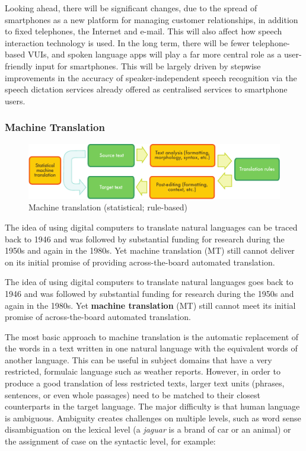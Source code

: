 \documentclass[]{../../metanetpaper}
\begin{document}
\begin{multicols}{2}
Looking ahead, there will be significant changes, due to the spread of smartphones as a new platform for managing customer relationships, in addition to fixed telephones, the Internet and e-mail. This will also affect how speech interaction technology is used. In the long term, there will be fewer telephone-based VUIs, and spoken language apps will play a far more central role as a user-friendly input for smartphones. This will be largely driven by stepwise improvements in the accuracy of speaker-independent speech recognition via the speech dictation services already offered as centralised services to smartphone users.

\subsubsection{Machine Translation}

\begin{figure}[htb]
  \center
  \includegraphics[width=\textwidth]{../_media/english/machine_translation}
  \caption{Machine translation (statistical; rule-based)}
  \label{fig:mtarch_en}
\end{figure}

The idea of using digital computers to translate natural languages can be traced back to 1946 and was followed by substantial funding for research during the 1950s and again in the 1980s. 
Yet machine translation (MT) still cannot deliver on its initial promise of providing across-the-board automated translation.  


The idea of using digital computers to translate natural languages goes back to 1946 and was followed by substantial funding for research during the 1950s and again in the 1980s. Yet \textbf{machine translation} (MT) still cannot meet its initial promise of across-the-board automated translation. 

The most basic approach to machine translation is the automatic replacement of the words in a text written in one natural language with the equivalent words of another language. This can be useful in subject domains that have a very restricted, formulaic language such as weather reports.
However, in order to produce a good translation of less restricted texts, larger text units (phrases, sentences, or even whole passages) need to be matched to their closest counterparts in the target language. The major difficulty is that human language is ambiguous. Ambiguity creates challenges on multiple levels, such as word sense disambiguation on the lexical level (a \textit{jaguar} is a brand of car or an animal) or the assignment of case on the syntactic level, for example:


\end{multicols}
\end{document}

